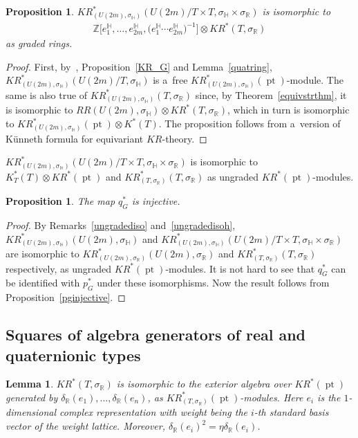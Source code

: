 \documentclass[pdftex]{sigma}
\numberwithin{equation}{section}
\newtheorem{Lemma}[Theorem]{Lemma}
\newtheorem{Proposition}[Theorem]{Proposition}
{\theoremstyle{definition}
\newtheorem{Definition}[Theorem]{Definition}
\newtheorem{Example}[Theorem]{Example}
\newtheorem{Remark}[Theorem]{Remark}
}
\DeclareMathOperator{\pt}{pt}
\begin{document}
\begin{Proposition}
$KR_{(U(2m),
\sigma_\mathbb{H})}^*(U(2m)/T\times T,
\sigma_\mathbb{H}
\times
\sigma_\mathbb{R})$ is isomorphic to
\begin{gather*}
\mathbb{Z}\big[e_1^\mathbb{H}, \dots, e_{2m}^\mathbb{H},
\big(e_1^\mathbb{H}\cdots e_{2m}^\mathbb{H}\big)^{-1}\big]
\otimes KR^*(T,\sigma_\mathbb{R})
\end{gather*}
as graded rings.
\end{Proposition}
\begin{proof}
First, by~\cite[Theorem~1]{P}, Proposition~\ref{KR_G} and Lemma~\ref{quatring}, $KR^*_{(U(2m),
\sigma_\mathbb{H})}(U(2m)/T,
\sigma_\mathbb{H})$ is a~free $KR_{(U(2m),
\sigma_\mathbb{H})}^*(\pt)$-module.
The same is also true of $KR_{(U(2m),
\sigma_\mathbb{H})}^*(T,
\sigma_\mathbb{R})$ since, by Theo\-rem~\ref{equivstrthm}, it is isomorphic to $RR(U(2m),
\sigma_\mathbb{H})\otimes KR^*(T,
\sigma_\mathbb{R})$, which in turn is isomorphic to $KR^*_{(U(2m),
\sigma_\mathbb{H})}(\pt)\otimes K^*(T)$.
The proposition
follows from a~version of K\"unneth formula for equivariant $KR$-theory.
\end{proof}
\begin{Remark}
\label{ungradedisoh}
$KR^*_{(U(2m),
\sigma_\mathbb{H})}(U(2m)/T\times T,
\sigma_\mathbb{H}
\times
\sigma_\mathbb{R})$ is isomorphic to $K^*_T(T)\otimes KR^*(\pt)$ and $KR^*_{(T,
\sigma_\mathbb{R})}(T,
\sigma_\mathbb{R})$ as ungraded $KR^*(\pt)$-modules.
\end{Remark}
\begin{Proposition}
\label{qginjective}
The map $q_G^*$ is injective.
\end{Proposition}
\begin{proof}
By Remarks~\ref{ungradediso} and~\ref{ungradedisoh}, $KR^*_{(U(2m),
\sigma_\mathbb{H})}(U(2m),
\sigma_\mathbb{H})$ and $KR^*_{(U(2m),
\sigma_\mathbb{H})}(U(2m)/T\times T,
\sigma_\mathbb{H}
\times
\sigma_\mathbb{R})$ are isomorphic to $KR^*_{(U(2m),
\sigma_\mathbb{R})}(U(2m),
\sigma_\mathbb{R})$ and $KR^*_{(T,
\sigma_\mathbb{R})}(T,
\sigma_\mathbb{R})$ respectively, as ungraded $KR^*(\pt)$-modules.
It is not hard to see that $q_G^*$ can be identif\/ied with $p_G^*$ under these isomorphisms.
Now the result follows from Proposition~\ref{pginjective}.
\end{proof}
\subsection{Squares of algebra generators of real and quaternionic types}
\begin{Lemma}
\label{eqkrthytorus}
$KR^*(T,
\sigma_\mathbb{R})$ is isomorphic to the exterior algebra over $KR^*(\pt)$ generated by $\delta_\mathbb{R}(e_1), \dots,
\delta_\mathbb{R}(e_n)$, as $KR^*_{(T,
\sigma_\mathbb{R})}(\pt)$-modules.
Here $e_i$ is the $1$-dimensional complex representation with weight being the $i$-th standard basis vector of the weight
lattice.
Moreover, $\delta_\mathbb{R}(e_i)^2=\eta\delta_\mathbb{R}(e_i)$.
\end{Lemma}
\end{document}
